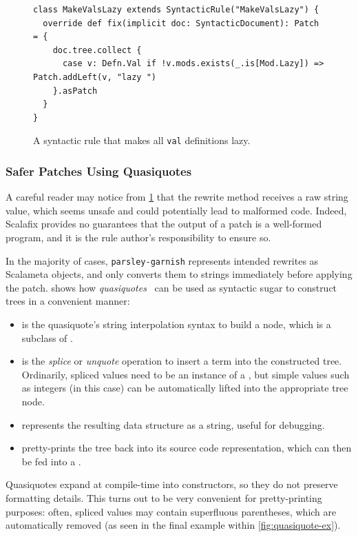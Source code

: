 \documentclass[../../main.tex]{subfiles}
\begin{document}
\begin{figure}[htbp]
\begin{verbatim}
class MakeValsLazy extends SyntacticRule("MakeValsLazy") {
  override def fix(implicit doc: SyntacticDocument): Patch = {
    doc.tree.collect {
      case v: Defn.Val if !v.mods.exists(_.is[Mod.Lazy]) => Patch.addLeft(v, "lazy ")
    }.asPatch
  }
}
\end{verbatim}
\caption{A syntactic rule that makes all \texttt{val} definitions lazy.}
\label{fig:syntactic-rule-ex}
\end{figure}

\subsubsection{Safer Patches Using Quasiquotes}
A careful reader may notice from \cref{fig:syntactic-rule-ex} that the  rewrite method receives a raw string value, which seems unsafe and could potentially lead to malformed code.
Indeed, Scalafix provides no guarantees that the output of a patch is a well-formed program, and it is the rule author's responsibility to ensure so.

In the majority of cases, \texttt{parsley-garnish} represents intended rewrites as Scalameta  objects, and only converts them to strings immediately before applying the patch.
 shows how \emph{quasiquotes}~\cite{shabalin_quasiquotes_2013} can be used as syntactic sugar to construct trees in a convenient manner:
\begin{itemize}
  \item {} is the quasiquote's string interpolation syntax to build a  node, which is a subclass of .
  \item {} is the \emph{splice} or \emph{unquote} operation to insert a term into the constructed tree. Ordinarily, spliced values need to be an instance of a , but simple values such as integers (in this case) can be automatically lifted into the appropriate tree node.
  \item {} represents the resulting  data structure as a string, useful for debugging.
  \item {} pretty-prints the tree back into its source code representation, which can then be fed into a .
\end{itemize}
Quasiquotes expand at compile-time into  constructors, so they do not preserve formatting details.
This turns out to be very convenient for pretty-printing purposes: often, spliced values may contain superfluous parentheses, which are automatically removed (as seen in the final example within \cref{fig:quasiquote-ex}).
\end{document}
